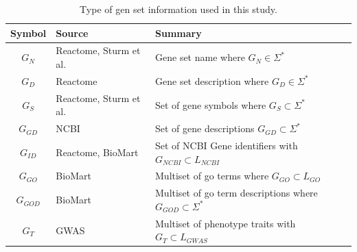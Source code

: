 \documentclass{thesisclass}
\begin{document}
\begin{table}[!ht]
	\begin{tabularx}{\linewidth}{c|l|X}
		Symbol & Source & Summary \\
		\hline
		$G_N$ & Reactome, Sturm et al. & Gene set name where $G_N \in  \Sigma^*$  \\
		$G_{D}$ & Reactome & Gene set description where $G_{D} \in \Sigma^*$ \\
		$G_S$ & Reactome, Sturm et al. & Set of gene symbols where $G_S \subset \Sigma^*$ \\
		$G_{GD}$& NCBI & Set of gene descriptions $G_{GD} \subset \Sigma^*$\\
		$G_{ID}$ & Reactome, BioMart & Set of NCBI Gene identifiers with $G_{NCBI} \subset L_{NCBI}$ \\
		$G_{GO}$& BioMart & Multiset of \acrshort{go} terms where $G_{GO} \subset L_{GO}$\\
		$G_{GOD}$& BioMart & Multiset of \acrshort{go} term descriptions where $G_{GOD} \subset \Sigma^*$\\
		$G_{T}$ & GWAS & Multiset of phenotype traits with $G_{T} \subset L_{GWAS}$\\
	\end{tabularx}
	\caption{Type of gen set information used in this study.}
	\label{fig:gs_info}
\end{table}
\end{document}
